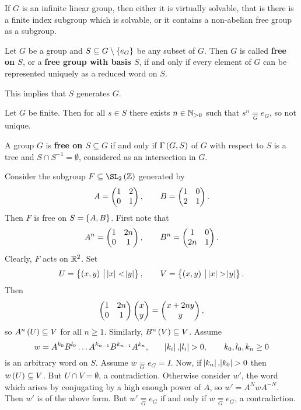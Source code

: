 \begin{fact}
If $ G $ is an infinite linear group, then either it is virtually solvable, that is there is a finite index subgroup which is solvable, or it contains a non-abelian free group as a subgroup.
\end{fact}

\begin{definition}
Let $ G $ be a group and $ S \subseteq G \setminus \cbr{e_G} $ be any subset of $ G $. Then $ G $ is called \textbf{free on $ S $}, or a \textbf{free group with basis $ S $}, if and only if every element of $ G $ can be represented uniquely as a reduced word on $ S $.
\end{definition}

\begin{remark*}
This implies that $ S $ generates $ G $.
\end{remark*}

\begin{example*}
Let $ G $ be finite. Then for all $ s \in S $ there exists $ n \in \mathbb{N}_{> 0} $ such that $ s^n \underset{G}{=} e_G $, so not unique.
\end{example*}

\begin{exercise}
\label{ex:1.4.3}
A group $ G $ is \textbf{free on $ S \subseteq G $} if and only if $ \Gamma\br{G, S} $ of $ G $ with respect to $ S $ is a tree and $ S \cap S^{-1} = \emptyset $, considered as an intersection in $ G $.
\end{exercise}

\begin{example}
Consider the subgroup $ F \subseteq \SL_2\br{\ZZ} $ generated by
$$ A = \begin{pmatrix} 1 & 2 \\ 0 & 1 \end{pmatrix}, \qquad B = \begin{pmatrix} 1 & 0 \\ 2 & 1 \end{pmatrix}. $$
Then $ F $ is free on $ S = \cbr{A, B} $. First note that
$$ A^n = \begin{pmatrix} 1 & 2n \\ 0 & 1 \end{pmatrix}, \qquad B^n = \begin{pmatrix} 1 & 0 \\ 2n & 1 \end{pmatrix}. $$
Clearly, $ F $ acts on $ \mathbb{R}^2 $. Set
$$ U = \cbr{\br{x, y} \st \abs{x} < \abs{y}}, \qquad V = \cbr{\br{x, y} \st \abs{x} > \abs{y}}. $$
Then
$$ \begin{pmatrix} 1 & 2n \\ 0 & 1 \end{pmatrix}\begin{pmatrix} x \\ y \end{pmatrix} = \begin{pmatrix} x + 2ny \\ y \end{pmatrix}, $$
so $ A^n\br{U} \subseteq V $ for all $ n \ge 1 $. Similarly, $ B^n\br{V} \subseteq V $. Assume
$$ w = A^{k_0}B^{l_0} \dots A^{k_{n - 1}}B^{k_{n - 1}}A^{k_n}, \qquad \abs{k_i}, \abs{l_i} > 0, \qquad k_0, l_0, k_n \ge 0 $$
is an arbitrary word on $ S $. Assume $ w \underset{G}{=} e_G = I $. Now, if $ \abs{k_n}, \abs{k_0} > 0 $ then $ w\br{U} \subseteq V $. But $ U \cap V = \emptyset $, a contradiction. Otherwise consider $ w' $, the word which arises by conjugating by a high enough power of $ A $, so $ w' = A^NwA^{-N} $. Then $ w' $ is of the above form. But $ w' \underset{G}{=} e_G $ if and only if $ w \underset{G}{=} e_G $, a contradiction.
\end{example}

